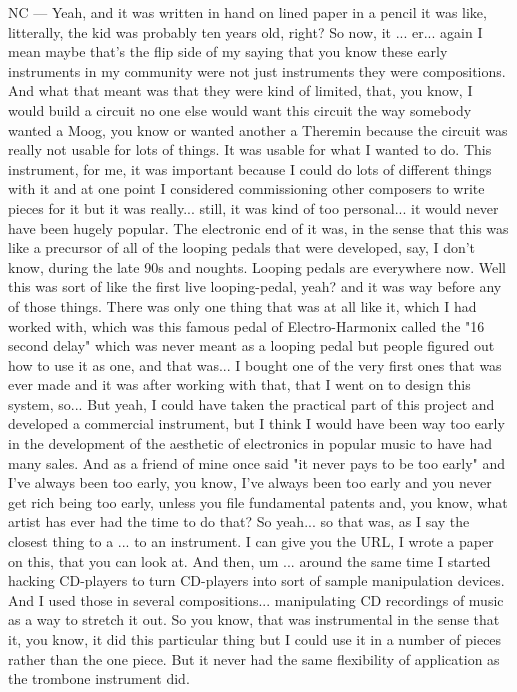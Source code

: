 NC — Yeah, and it was written in hand on lined paper in a pencil it was like, litterally, the kid  was probably ten years old, right? So now, it ... er... again I mean maybe that's the flip side of my saying that you know these early instruments in my community were not just instruments they were compositions. And what that meant was that they were kind of limited, that, you know, I would build a circuit no one else would want this circuit the way somebody wanted a Moog, you know or wanted another a Theremin because the circuit was really not usable for lots of things. It was usable for what I wanted to do. This instrument, for me, it was important because I could do lots of different things with it and at one point I considered commissioning other composers to write pieces for it but it was really... still, it was kind of too personal... it would never have been hugely popular. The electronic end of it was, in the sense that this was like a precursor of all of the looping pedals that were developed, say, I don't know, during the late 90s and noughts. Looping pedals are everywhere now. Well this was sort of like the first live looping-pedal, yeah?  and it was way before any of those things. There was only one thing that was at all like it, which I had worked with, which was this famous pedal of Electro-Harmonix called the "16 second delay" which was never meant as a looping pedal but people figured out how to use it as one, and that was... I bought one of the very first ones that was ever made and it was after working with that, that I went on to design this system, so... But yeah, I could have taken the practical part of this project and developed a commercial instrument, but I think I would have been way too early in the development of the aesthetic of electronics in popular music to have had many sales. And as a friend of mine once said "it never pays to be too early" and I've always been too early, you know, I've always been too early and you never get rich being too early, unless you file fundamental patents and, you know, what artist has ever had the time to do that? So yeah... so that was, as I say the closest thing to a ... to an instrument. I can give you the URL, I wrote a paper on this, that you can look at. And then, um ... around the same time I started hacking CD-players to turn CD-players into sort of sample manipulation devices. And I used those in several compositions... manipulating CD recordings of music as a way to stretch it out. So you know, that was instrumental in the sense that it, you know, it did this particular thing but I could use it in a number of pieces rather than the one piece. But it never had the same flexibility of application as the trombone instrument did. 

